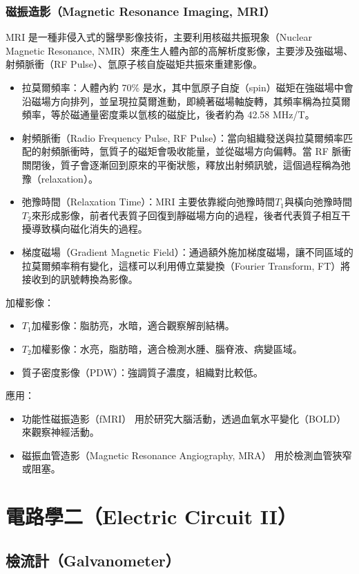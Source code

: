 \documentclass[a4paper,12pt]{report}
\begin{document}
\begin{itemize}
\subsubsection{磁振造影（Magnetic Resonance Imaging, MRI）}
MRI 是一種非侵入式的醫學影像技術，主要利用核磁共振現象（Nuclear Magnetic Resonance, NMR）來產生人體內部的高解析度影像，主要涉及強磁場、射頻脈衝（RF Pulse）、氫原子核自旋磁矩共振來重建影像。
\begin{itemize}
\item 拉莫爾頻率：人體內約 70\% 是水，其中氫原子自旋（spin）磁矩在強磁場中會沿磁場方向排列，並呈現拉莫爾進動，即繞著磁場軸旋轉，其頻率稱為拉莫爾頻率，等於磁通量密度乘以氫核的磁旋比，後者約為 42.58 MHz/T。
\item 射頻脈衝（Radio Frequency Pulse, RF Pulse）：當向組織發送與拉莫爾頻率匹配的射頻脈衝時，氫質子的磁矩會吸收能量，並從磁場方向偏轉。當 RF 脈衝關閉後，質子會逐漸回到原來的平衡狀態，釋放出射頻訊號，這個過程稱為弛豫（relaxation）。
\item 弛豫時間（Relaxation Time）：MRI 主要依靠縱向弛豫時間$T_1$與橫向弛豫時間$T_2$來形成影像，前者代表質子回復到靜磁場方向的過程，後者代表質子相互干擾導致橫向磁化消失的過程。
\item 梯度磁場（Gradient Magnetic Field）：通過額外施加梯度磁場，讓不同區域的拉莫爾頻率稍有變化，這樣可以利用傅立葉變換（Fourier Transform, FT）將接收到的訊號轉換為影像。
\end{itemize}
加權影像：
\begin{itemize}
\item $T_1$加權影像：脂肪亮，水暗，適合觀察解剖結構。
\item $T_2$加權影像：水亮，脂肪暗，適合檢測水腫、腦脊液、病變區域。
\item 質子密度影像（PDW）：強調質子濃度，組織對比較低。
\end{itemize}
應用：
\begin{itemize}
\item 功能性磁振造影（fMRI） 用於研究大腦活動，透過血氧水平變化（BOLD）來觀察神經活動。
\item 磁振血管造影（Magnetic Resonance Angiography, MRA） 用於檢測血管狹窄或阻塞。
\end{itemize}


\section{電路學二（Electric Circuit II）}
\subsection{檢流計（Galvanometer）}

\end{itemize}
\end{document}
